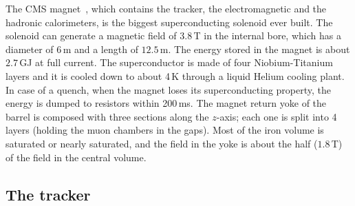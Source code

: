 The CMS magnet~\cite{CMSmagnet}, which contains the tracker, the electromagnetic and the hadronic calorimeters, is the biggest superconducting solenoid ever built. The solenoid can generate a magnetic field of $3.8$\,T in the internal bore, which has a diameter of 6\,m and a length of $12.5$\,m. The energy stored in the magnet is about $2.7$\,GJ at full current. The superconductor is made of four Niobium-Titanium layers and it is cooled down to about 4\,K through a liquid Helium cooling plant. In case of a quench, when the magnet loses its superconducting property, the energy is dumped to resistors within 200\,ms. The magnet return yoke of the barrel is composed with three sections along the $z$-axis; each one is split into 4 layers (holding the muon chambers in the gaps). Most of the iron volume is saturated or nearly saturated, and the field in the yoke is about the half ($1.8$\,T) of the field in the central volume.

\subsection{The tracker}

